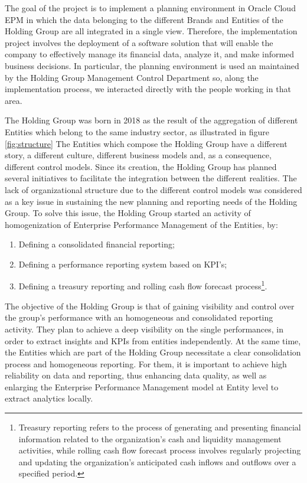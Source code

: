 \documentclass[12pt,a4paper,openright,twoside]{book}
\begin{document}
The goal of the project is to implement a planning environment in Oracle Cloud EPM in which the data belonging to the different Brands and Entities of the Holding Group are all integrated in a single view.
%
Therefore, the implementation project involves the deployment of a software solution that will enable the company to effectively manage its financial data, analyze it, and make informed business decisions.
%
In particular, the planning environment is used an maintained by the Holding Group Management Control Department so, along the implementation process, we interacted directly with the people working in that area.

The Holding Group was born in 2018 as the result of the aggregation of different Entities which belong to the same industry sector, as illustrated in figure \ref{fig:structure}
%
The Entities which compose the Holding Group have a different story, a different culture, different business models and, as a consequence, different control models.
%
Since its creation, the Holding Group has planned several initiatives to facilitate the integration between the different realities.
%
The lack of organizational structure due to the different control models was considered as a key issue in sustaining the new planning and reporting needs of the Holding Group.
%
To solve this issue, the Holding Group started an activity of homogenization of Enterprise Performance Management of the Entities, by:

\begin{enumerate}
    \item Defining a consolidated financial reporting;
    \item Defining a performance reporting system based on KPI’s;
    \item Defining a treasury reporting and rolling cash flow forecast process\footnote{Treasury reporting refers to the process of generating and presenting financial information related to the organization's cash and liquidity management activities, while rolling cash flow forecast process involves regularly projecting and updating the organization's anticipated cash inflows and outflows over a specified period.}.
\end{enumerate}

The objective of the Holding Group is that of gaining visibility and control over the group's performance with an homogeneous and consolidated reporting activity.
%
They plan to achieve a deep visibility on the single performances, in order to extract insights and KPIs from entities independently.
%
At the same time, the Entities which are part of the Holding Group necessitate a clear consolidation process and homogeneous reporting.
%
For them, it is important to achieve high reliability on data and reporting, thus enhancing data quality, as well as enlarging the Enterprise Performance Management model at Entity level to extract analytics locally.
\end{document}
